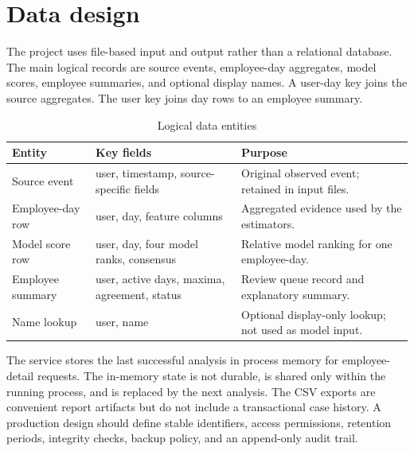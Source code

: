 \section{Data design}
The project uses file-based input and output rather than a relational
database. The main logical records are source events, employee-day
aggregates, model scores, employee summaries, and optional display
names. A user-day key joins the source aggregates. The user key joins
day rows to an employee summary.

\begin{table}[H]
\centering
\tablefont
\caption{Logical data entities}
\label{tab:entities}
\begin{tabularx}{\textwidth}{|p{}|p{}|Y|}
\hline
\textbf{Entity} & \textbf{Key fields} & \textbf{Purpose}\\\hline
Source event & user, timestamp, source-specific fields & Original observed event; retained in input files.\\\hline
Employee-day row & user, day, feature columns & Aggregated evidence used by the estimators.\\\hline
Model score row & user, day, four model ranks, consensus & Relative model ranking for one employee-day.\\\hline
Employee summary & user, active days, maxima, agreement, status & Review queue record and explanatory summary.\\\hline
Name lookup & user, name & Optional display-only lookup; not used as model input.\\\hline
\end{tabularx}
\end{table}

The service stores the last successful analysis in process memory for
employee-detail requests. The in-memory state is not durable, is
shared only within the running process, and is replaced by the next
analysis. The CSV exports are convenient report artifacts but do not
include a transactional case history. A production design should
define stable identifiers, access permissions, retention periods,
integrity checks, backup policy, and an append-only audit trail.

